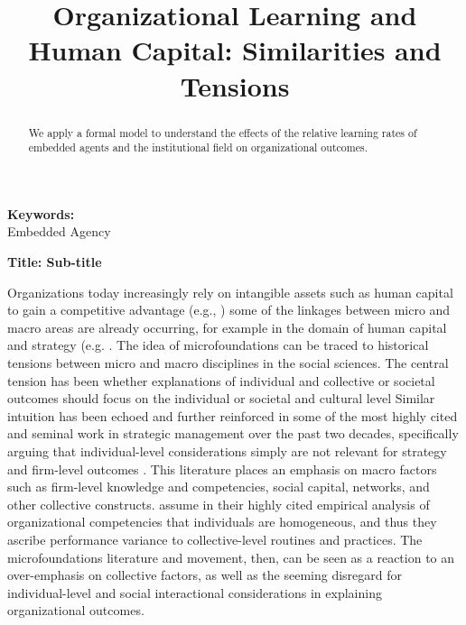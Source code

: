 \documentclass[12pt,letterpaper]{article}
\begin{document}
\title{Organizational Learning and Human Capital: Similarities and Tensions}
\date{}
\maketitle

\begin{abstract} 
\normalsize 
We apply a formal model to understand the effects of the relative learning rates of embedded agents and the institutional field on organizational outcomes. 
\end{abstract}


{\textbf{Keywords:} \\\indent Embedded Agency}

\newpage
\pagestyle{fancy}
\fancyhf{}
\rhead{\thepage}

\begin{center}
\textbf{Title: Sub-title}
\end{center}


Organizations today increasingly rely on intangible assets such as human capital to gain a competitive advantage (e.g., \cite{Barney1991})
some of the linkages between micro and macro areas are already occurring, for example in the domain of human capital and strategy (e.g. \cite{Coff2011, Ployhart2011}. The idea of microfoundations can be traced to historical tensions between micro and macro disciplines in the social sciences. The central tension has been whether explanations of individual and collective or societal outcomes should focus on the individual or societal and cultural level \citep{Udehn2001}
Similar intuition has been echoed and further reinforced in some of the most highly cited and seminal work in strategic management over the past two decades, specifically arguing that individual-level considerations simply are not relevant for strategy and firm-level outcomes \citep{Henderson1994, Kogut1992, Kogut1996, Nahapiet1998, Spender1996}. This literature places an emphasis on macro factors such as firm-level knowledge and competencies, social capital, networks, and other collective constructs. \citep{Henderson1994} assume in their highly cited empirical analysis of organizational competencies that individuals are homogeneous, and thus they ascribe performance variance to collective-level routines and practices. The microfoundations literature and movement, then, can be seen as a reaction to an over-emphasis on collective factors, as well as the seeming disregard for individual-level and social interactional considerations in explaining organizational outcomes.
\end{document}

